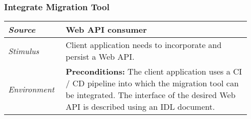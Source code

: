 \subsubsection{Integrate Migration Tool}
\label{subsubsec:UseCase:IntegrateTool}

\vspace{-2mm}
\begin{center}
    \def\arraystretch{1.5}
    \begin{longtable}{ p{0.22\linewidth} p{0.72\linewidth} }
    \hline
        \textit{Source} & Web API consumer\\
    \hline
        \textit{Stimulus} & Client application needs to incorporate and persist a Web API. \\
    \hline
    	\textit{Environment} & \textbf{Preconditions:} The client application uses a CI / CD pipeline into which the migration tool can be integrated. The interface of the desired Web API is described using an IDL document.
    	

\end{longtable}
\end{center}
